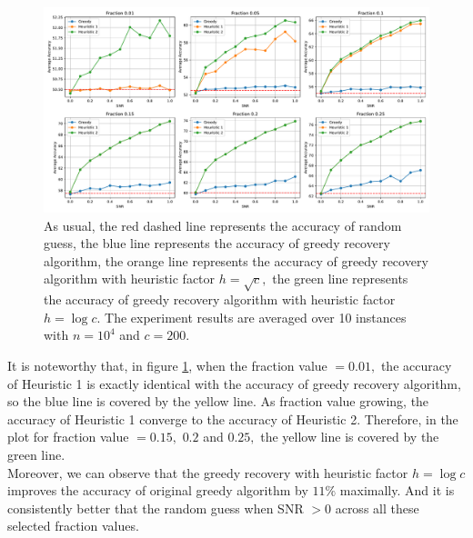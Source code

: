 \begin{figure}[H]
    \centering
    \includegraphics[width=1\linewidth]{Figures/Greedy_Recovery_heur_Super_dense.pdf}
    \caption[The accuracy of greedy recovery algorithm versus heuristic strategy with 2 different factors.]{As usual, the red dashed line represents the accuracy of random guess, the blue line represents the accuracy of greedy recovery algorithm, the orange line represents the accuracy of greedy recovery algorithm with heuristic factor $h=\sqrt{c},$ the green line represents the accuracy of greedy recovery algorithm with heuristic factor $h=\log{c}.$ The experiment results are averaged over 10 instances with $n=10^4$ and $c=200.$}
    \label{fig: heuristic greedy}
\end{figure}
It is noteworthy that, in figure \ref{fig: heuristic greedy}, when the fraction value $=0.01,$ the accuracy of Heuristic 1 is exactly identical with the accuracy of greedy recovery algorithm, so the blue line is covered by the yellow line. As fraction value growing, the accuracy of Heuristic 1 converge to the  accuracy of Heuristic 2. Therefore, in the plot for fraction value $=0.15,$ $0.2$ and $0.25,$ the yellow line is covered by the green line.\\
Moreover, we can observe that the greedy recovery with heuristic factor $h=\log{c}$ improves the accuracy of original greedy algorithm by $11\%$ maximally. And it is consistently better that the random guess when SNR $>0$ across all these selected fraction values.


